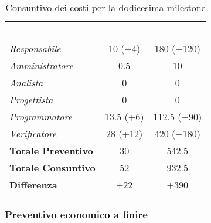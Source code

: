 \begin{table}[H]
    \renewcommand\arraystretch{1.5}
    \centering
    \begin{tabular}{|l|c|c|}
    \hline
    \rowcolor[HTML]{036400}
    \textcolor{white}{\textbf{Ruolo}} & \multicolumn{1}{l|}{\textcolor{white}{\textbf{Ore}}} & \multicolumn{1}{l|}{\textcolor{white}{\textbf{Costo (€)}}} \\ \hline
    \rowcolor[HTML]{EFEFEF}\textit{Responsabile}      & 10 (+4)           & 180 (+120)            \\ \hline
    \rowcolor[HTML]{C0C0C0}\textit{Amministratore}    & 0.5         & 10              \\ \hline
    \rowcolor[HTML]{EFEFEF}\textit{Analista}          & 0           & 0               \\ \hline
    \rowcolor[HTML]{C0C0C0}\textit{Progettista}       & 0           & 0           \\ \hline
    \rowcolor[HTML]{EFEFEF}\textit{Programmatore}     & 13.5 (+6)        & 112.5 (+90)        \\ \hline
    \rowcolor[HTML]{C0C0C0}\textit{Verificatore}      & 28 (+12)          & 420  (+180)          \\ \hline
    \rowcolor[HTML]{EFEFEF}\textbf{Totale Preventivo} & 30          & 542.5          \\ \hline
    \rowcolor[HTML]{C0C0C0}\textbf{Totale Consuntivo} & 52          & 932.5            \\ \hline
    \rowcolor[HTML]{EFEFEF}\textbf{Differenza}        & +22           & +390            \\ \hline
    \end{tabular}
    \caption{Consuntivo dei costi per la dodicesima milestone}
\end{table}

\subsubsection{Preventivo economico a finire}

